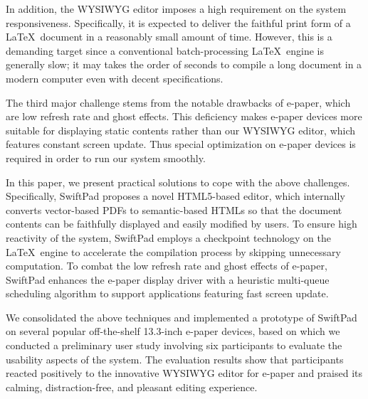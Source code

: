 \documentclass[]{sigchi}
\begin{document}
In addition, the WYSIWYG editor imposes a high requirement on the system responsiveness. Specifically, it is expected to deliver the faithful print form of a \LaTeX\ document in a reasonably small amount of time.
However, this is a demanding target since a conventional batch-processing \LaTeX\ engine is generally slow; it may takes the order of seconds to compile a long document in a modern computer even with decent specifications.

The third major challenge stems from the notable drawbacks of e-paper, which are low refresh rate and ghost effects.
This deficiency makes e-paper devices more suitable for displaying static contents rather than our WYSIWYG editor, which features constant screen update. Thus special optimization on e-paper devices is required in order to run our system smoothly.

In this paper, we present practical solutions to cope with the above challenges. Specifically, SwiftPad proposes a novel HTML5-based editor, which internally converts vector-based PDFs to semantic-based HTMLs so that the document contents can be faithfully displayed and easily modified by users. To ensure high reactivity of the system, SwiftPad employs a checkpoint technology on the \LaTeX\ engine to accelerate the compilation process by skipping unnecessary computation. To combat the low refresh rate and ghost effects of e-paper, SwiftPad enhances the e-paper display driver with a heuristic multi-queue scheduling algorithm to support applications featuring fast screen update.



We consolidated the above techniques and implemented a prototype of SwiftPad on several popular off-the-shelf 13.3-inch e-paper devices, based on which we conducted a preliminary user study involving six participants to evaluate the usability aspects of the system. The evaluation results show that participants reacted positively to the innovative WYSIWYG editor for e-paper and praised its calming, distraction-free, and pleasant editing experience.
\end{document}
